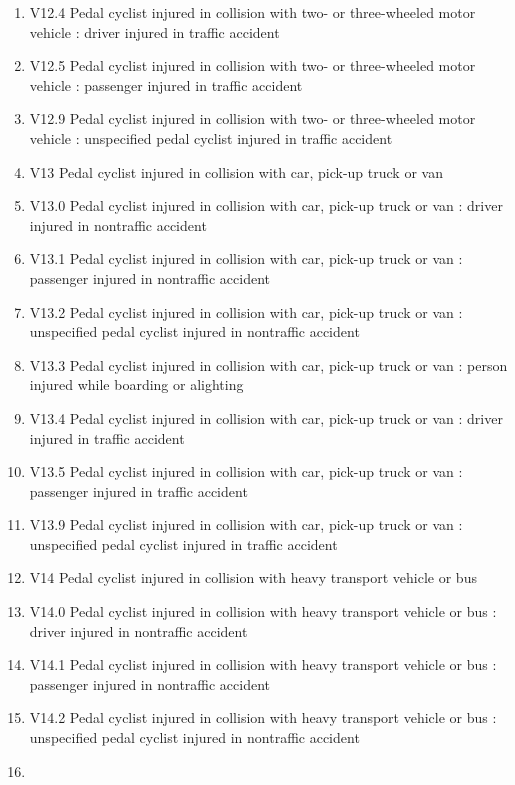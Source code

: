 \documentclass[
]{scrartcl}
\begin{document}
\begin{itemize}
\begin{enumerate}
  \item
    V12.4 Pedal cyclist injured in collision with two- or three-wheeled
    motor vehicle : driver injured in traffic accident
  \item
    V12.5 Pedal cyclist injured in collision with two- or three-wheeled
    motor vehicle : passenger injured in traffic accident
  \item
    V12.9 Pedal cyclist injured in collision with two- or three-wheeled
    motor vehicle : unspecified pedal cyclist injured in traffic
    accident
  \item
    V13 Pedal cyclist injured in collision with car, pick-up truck or
    van
  \item
    V13.0 Pedal cyclist injured in collision with car, pick-up truck or
    van : driver injured in nontraffic accident
  \item
    V13.1 Pedal cyclist injured in collision with car, pick-up truck or
    van : passenger injured in nontraffic accident
  \item
    V13.2 Pedal cyclist injured in collision with car, pick-up truck or
    van : unspecified pedal cyclist injured in nontraffic accident
  \item
    V13.3 Pedal cyclist injured in collision with car, pick-up truck or
    van : person injured while boarding or alighting
  \item
    V13.4 Pedal cyclist injured in collision with car, pick-up truck or
    van : driver injured in traffic accident
  \item
    V13.5 Pedal cyclist injured in collision with car, pick-up truck or
    van : passenger injured in traffic accident
  \item
    V13.9 Pedal cyclist injured in collision with car, pick-up truck or
    van : unspecified pedal cyclist injured in traffic accident
  \item
    V14 Pedal cyclist injured in collision with heavy transport vehicle
    or bus
  \item
    V14.0 Pedal cyclist injured in collision with heavy transport
    vehicle or bus : driver injured in nontraffic accident
  \item
    V14.1 Pedal cyclist injured in collision with heavy transport
    vehicle or bus : passenger injured in nontraffic accident
  \item
    V14.2 Pedal cyclist injured in collision with heavy transport
    vehicle or bus : unspecified pedal cyclist injured in nontraffic
    accident
  \item

\end{enumerate}
\end{itemize}
\end{document}
